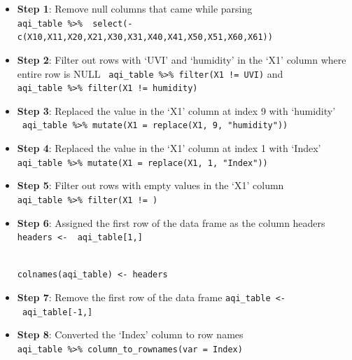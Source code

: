 \documentclass[
]{article}
\providecommand{\tightlist}{%
  \setlength{\itemsep}{0pt}\setlength{\parskip}{0pt}}
\begin{document}
\begin{itemize}
\tightlist
\item
  \textbf{Step 1}: Remove null columns that came while parsing\\
  \texttt{aqi\_table\ \%\textgreater{}\%\ \ select(-c(\textquotesingle{}X10\textquotesingle{},\textquotesingle{}X11\textquotesingle{},\textquotesingle{}X20\textquotesingle{},\textquotesingle{}X21\textquotesingle{},\textquotesingle{}X30\textquotesingle{},\textquotesingle{}X31\textquotesingle{},\textquotesingle{}X40\textquotesingle{},\textquotesingle{}X41\textquotesingle{},\textquotesingle{}X50\textquotesingle{},\textquotesingle{}X51\textquotesingle{},\textquotesingle{}X60\textquotesingle{},\textquotesingle{}X61\textquotesingle{}))}
\item
  \textbf{Step 2}: Filter out rows with `UVI' and `humidity' in the `X1'
  column where entire row is NULL
  ~\texttt{aqi\_table\ \%\textgreater{}\%\ filter(X1\ !=\ \textquotesingle{}UVI\textquotesingle{})}
  and
  \texttt{aqi\_table\ \%\textgreater{}\%\ filter(X1\ !=\ \textquotesingle{}humidity\textquotesingle{})}
\item
  \textbf{Step 3}: Replaced the value in the `X1' column at index 9 with
  `humidity'
  ~\texttt{aqi\_table\ \%\textgreater{}\%\ mutate(X1\ =\ replace(X1,\ 9,\ "humidity"))}
\item
  \textbf{Step 4}: Replaced the value in the `X1' column at index 1 with
  `Index'\\
  \texttt{aqi\_table\ \%\textgreater{}\%\ mutate(X1\ =\ replace(X1,\ 1,\ "Index"))}
\item
  \textbf{Step 5}: Filter out rows with empty values in the `X1'
  column\\
  \texttt{aqi\_table\ \%\textgreater{}\%\ filter(X1\ !=\ \textquotesingle{}\textquotesingle{})}
\item
  \textbf{Step 6}: Assigned the first row of the data frame as the
  column headers\\
  \texttt{headers\ \textless{}-\ \ aqi\_table{[}1,{]}}\strut \\
  \texttt{colnames(aqi\_table)\ \textless{}-\ headers}
\item
  \textbf{Step 7}: Remove the first row of the data frame
  \texttt{aqi\_table\ \textless{}-\ aqi\_table{[}-1,{]}}
\item
  \textbf{Step 8}: Converted the `Index' column to row names
  \texttt{aqi\_table\ \%\textgreater{}\%\ column\_to\_rownames(var\ =\ \textquotesingle{}Index\textquotesingle{})}
\end{itemize}
\end{document}
